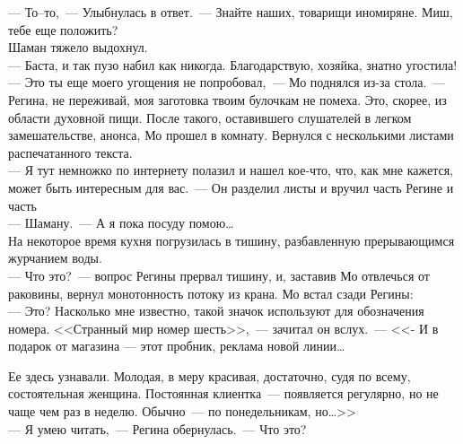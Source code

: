 \noindent --- То--то,~--- Улыбнулась в ответ.~--- Знайте наших, товарищи иномиряне. Миш, 
тебе еще положить?\\
Шаман тяжело выдохнул.\\
--- Баста, и так пузо набил как никогда. Благодарствую, хозяйка, знатно угостила!\\
--- Это ты еще моего угощения не попробовал,~--- Мо поднялся из-за стола.~--- 
Регина, не переживай, моя заготовка твоим булочкам не помеха. Это, скорее, из области 
духовной пищи. После такого, оставившего слушателей в легком замешательстве, 
анонса, Мо прошел в комнату. Вернулся с несколькими листами распечатанного 
текста.\\
--- Я тут немножко по интернету полазил и нашел кое-что, что, как мне кажется, 
может быть интересным для вас.~--- Он разделил листы и вручил часть Регине и 
часть\\ 
--- Шаману.~--- А я пока посуду помою\ldots\\
На некоторое время кухня погрузилась в тишину, разбавленную прерывающимся 
журчанием воды. \\
--- Что это?~--- вопрос Регины прервал тишину, и, заставив Мо отвлечься от 
раковины, вернул монотонность потоку из крана. Мо встал сзади Регины:\\
--- Это? Насколько мне известно, такой значок используют для обозначения номера. 
<<Странный мир номер шесть>>,~--- зачитал он вслух.~--- <<- И в подарок от 
магазина --- этот пробник, реклама новой линии\ldots\ 

Ее здесь узнавали. Молодая, в меру красивая, достаточно, судя по всему, 
состоятельная женщина. Постоянная клиентка~--- появляется регулярно, но не чаще 
чем раз в неделю. Обычно~--- по понедельникам, но\ldots>>\\
--- Я умею читать,~--- Регина обернулась.~--- Что это?

